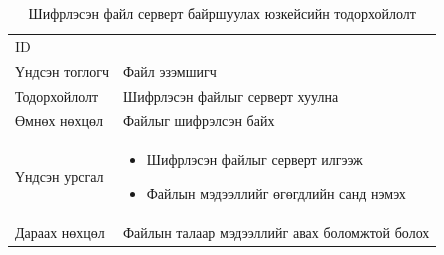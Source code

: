 \begin{table}[H]
    \footnotesize
    \centering
    \begin{tabularx}{\textwidth}{|>{\hsize=0.3\hsize}X|>{\hsize=0.7\hsize}X|}
        \hline
        \multicolumn{2}{|c|}{Шифрлэсэн файл серверт байршуулах}        \\
        \hline
        ID             & 4                                             \\
        \hline
        Үндсэн тоглогч & Файл эзэмшигч                                 \\
        \hline
        Тодорхойлолт   & Шифрлэсэн файлыг серверт хуулна               \\
        \hline
        Өмнөх нөхцөл   & Файлыг шифрэлсэн байх                         \\
        \hline
        Үндсэн урсгал  &
        \begin{minipage}{\linewidth}
            \begin{itemize}
                \item Шифрлэсэн файлыг серверт илгээж
                \item Файлын мэдээллийг өгөгдлийн санд нэмэх
            \end{itemize}
        \end{minipage}
        \\
        \hline
        Дараах нөхцөл  & Файлын талаар мэдээллийг авах боломжтой болох \\
        \hline
    \end{tabularx}
    \caption{Шифрлэсэн файл серверт байршуулах юзкейсийн тодорхойлолт}
\end{table}


